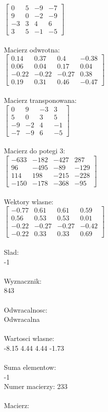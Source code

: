 \documentclass[a4paper,12pt]{article}
\begin{document}
$\begin{bmatrix} 0&5&-9&-7\\9&0&-2&-9\\-3&3&4&6\\3&5&-1&-5 \end{bmatrix}$
\\
\\
Macierz odwrotna:\\

$\begin{bmatrix} 0.14&0.37&0.4&-0.38\\0.06&0.04&0.17&0.04\\-0.22&-0.22&-0.27&0.38\\0.19&0.31&0.46&-0.47 \end{bmatrix}$
\\
\\
Macierz transponowana:\\

$\begin{bmatrix} 0&9&-3&3\\5&0&3&5\\-9&-2&4&-1\\-7&-9&6&-5 \end{bmatrix}$
\\
\\
Macierz do potegi 3:\\

$\begin{bmatrix} -633&-182&-427&287\\96&-495&-89&-129\\114&198&-215&-228\\-150&-178&-368&-95 \end{bmatrix}$
\\
\\
Wektory wlasne:\\

$\begin{bmatrix} -0.77&0.61&0.61&0.59\\0.56&0.53&0.53&0.01\\-0.22&-0.27&-0.27&-0.42\\-0.22&0.33&0.33&0.69 \end{bmatrix}$
\\
\\
Slad:\\
-1
\\
\\
Wyznacznik:\\
843
\\
\\
Odwracalnosc:\\
Odwracalna
\\
\\
Wartosci wlasne:\\
-8.15 4.44 4.44 -1.73
\\
\\
Suma elementow:\\
-1
\\
\newpage
Numer macierzy:
233
\\
\\
Macierz:\\
\end{document}
